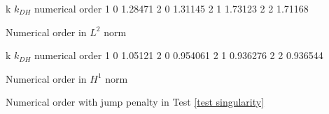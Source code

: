 \begin{table}[H]
\centering
\begin{subtable}[b]{0.45\textwidth}
	\centering
	\pgfplotstabletypeset
	{
		k $k_{DH}$ {numerical order}
		1 0 1.28471
		2 0 1.31145
		2 1 1.73123
		2 2 1.71168
	}
	\caption{Numerical order in $L^2$ norm}
	\end{subtable}
	\begin{subtable}[b]{0.45\textwidth}
	\centering
	\pgfplotstabletypeset
	{
		k $k_{DH}$ {numerical order}
		1 0 1.05121
		2 0 0.954061
		2 1 0.936276
		2 2 0.936544
	}
	\caption{Numerical order in $H^1$ norm}
	\end{subtable}
	\caption{Numerical order with jump penalty in Test \ref{test singularity}}
\label{tab: order jump 4}
\end{table}
